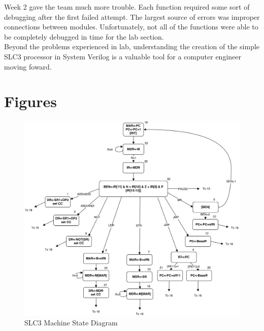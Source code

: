 \documentclass[journal, twocolumn, final,11pt,letterpaper]{IEEEtran}
\begin{document}
Week 2 gave the team much more trouble.  Each function required some sort of debugging after the first failed attempt.  The largest source of errors was improper connections between modules.  Unfortunately, not all of the functions were able to be completely debugged in time for the lab section. \\

Beyond the problems experienced in lab, understanding the creation of the simple SLC3 processor in System Verilog is a valuable tool for a computer engineer moving foward.   \\      



\clearpage
\onecolumn
\section{Figures}

\begin{figure} [htbp]
	\centering	
	\includegraphics[scale=0.7]{state-diagram.png}
	\caption{SLC3 Machine State Diagram	\label{fig:state-diagram}}
\end{figure}
\end{document}
